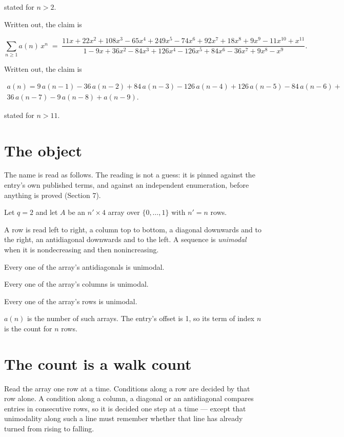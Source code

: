 \documentclass[11pt]{article}
\theoremstyle{definition}
\begin{document}
stated for $n > 2$.

Written out, the claim is

\[\sum_{n \ge 1} a(n)\,x^n \;=\; \frac{11x + 22x^{2} + 108x^{3} - 65x^{4} + 249x^{5} - 74x^{6} + 92x^{7} + 18x^{8} + 9x^{9} - 11x^{10} + x^{11}}{1 - 9x + 36x^{2} - 84x^{3} + 126x^{4} - 126x^{5} + 84x^{6} - 36x^{7} + 9x^{8} - x^{9}}.\]

Written out, the claim is

\begin{multline*} a(n) = 9\,a(n-1) - 36\,a(n-2) + 84\,a(n-3) - 126\,a(n-4) + 126\,a(n-5) - 84\,a(n-6) + \\ 36\,a(n-7) - 9\,a(n-8) + a(n-9). \end{multline*}

stated for $n > 11$.

\section{The object}

The name is read as follows. The reading is not a guess: it is pinned against the entry's own published terms, and against an independent enumeration, before anything is proved (Section 7).

Let $q = 2$ and let $A$ be an $n' \times 4$ array over $\{0,\dots,1\}$ with $n' = n$ rows.

A row is read left to right, a column top to bottom, a diagonal downwards and to the right, an antidiagonal downwards and to the left. A sequence is {\itshape unimodal} when it is nondecreasing and then nonincreasing.

Every one of the array's antidiagonals is unimodal.

Every one of the array's columns is unimodal.

Every one of the array's rows is unimodal.

$a(n)$ is the number of such arrays. The entry's offset is 1, so its term of index $n$ is the count for $n$ rows.

\section{The count is a walk count}

Read the array one row at a time. Conditions along a row are decided by that row alone. A condition along a column, a diagonal or an antidiagonal compares entries in consecutive rows, so it is decided one step at a time --- except that unimodality along such a line must remember whether that line has already turned from rising to falling.
\end{document}
